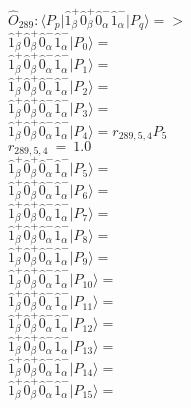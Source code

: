 \documentclass[14pt]{article}
\begin{document}
    $\hat{O}_{289}:  \langle{P_p}\vert \hat{1}_{\beta}^{+}\hat{0}_{\beta}^{+}\hat{0}_{\alpha}^{-}\hat{1}_{\alpha}^{-} \vert{P_q}\rangle => $ \\ 
    $ \hat{1}_{\beta}^{+}\hat{0}_{\beta}^{+}\hat{0}_{\alpha}^{-}\hat{1}_{\alpha}^{-} \vert{P_{0}}\rangle =  $ \\ 
    $ \hat{1}_{\beta}^{+}\hat{0}_{\beta}^{+}\hat{0}_{\alpha}^{-}\hat{1}_{\alpha}^{-} \vert{P_{1}}\rangle =  $ \\ 
    $ \hat{1}_{\beta}^{+}\hat{0}_{\beta}^{+}\hat{0}_{\alpha}^{-}\hat{1}_{\alpha}^{-} \vert{P_{2}}\rangle =  $ \\ 
    $ \hat{1}_{\beta}^{+}\hat{0}_{\beta}^{+}\hat{0}_{\alpha}^{-}\hat{1}_{\alpha}^{-} \vert{P_{3}}\rangle =  $ \\ 
    $ \hat{1}_{\beta}^{+}\hat{0}_{\beta}^{+}\hat{0}_{\alpha}^{-}\hat{1}_{\alpha}^{-} \vert{P_{4}}\rangle = {r}_{289,5,4}P_{5} $ \\ 
    ${r}_{289,5,4}\ =\ 1.0 $ \\ 
    $ \hat{1}_{\beta}^{+}\hat{0}_{\beta}^{+}\hat{0}_{\alpha}^{-}\hat{1}_{\alpha}^{-} \vert{P_{5}}\rangle =  $ \\ 
    $ \hat{1}_{\beta}^{+}\hat{0}_{\beta}^{+}\hat{0}_{\alpha}^{-}\hat{1}_{\alpha}^{-} \vert{P_{6}}\rangle =  $ \\ 
    $ \hat{1}_{\beta}^{+}\hat{0}_{\beta}^{+}\hat{0}_{\alpha}^{-}\hat{1}_{\alpha}^{-} \vert{P_{7}}\rangle =  $ \\ 
    $ \hat{1}_{\beta}^{+}\hat{0}_{\beta}^{+}\hat{0}_{\alpha}^{-}\hat{1}_{\alpha}^{-} \vert{P_{8}}\rangle =  $ \\ 
    $ \hat{1}_{\beta}^{+}\hat{0}_{\beta}^{+}\hat{0}_{\alpha}^{-}\hat{1}_{\alpha}^{-} \vert{P_{9}}\rangle =  $ \\ 
    $ \hat{1}_{\beta}^{+}\hat{0}_{\beta}^{+}\hat{0}_{\alpha}^{-}\hat{1}_{\alpha}^{-} \vert{P_{10}}\rangle =  $ \\ 
    $ \hat{1}_{\beta}^{+}\hat{0}_{\beta}^{+}\hat{0}_{\alpha}^{-}\hat{1}_{\alpha}^{-} \vert{P_{11}}\rangle =  $ \\ 
    $ \hat{1}_{\beta}^{+}\hat{0}_{\beta}^{+}\hat{0}_{\alpha}^{-}\hat{1}_{\alpha}^{-} \vert{P_{12}}\rangle =  $ \\ 
    $ \hat{1}_{\beta}^{+}\hat{0}_{\beta}^{+}\hat{0}_{\alpha}^{-}\hat{1}_{\alpha}^{-} \vert{P_{13}}\rangle =  $ \\ 
    $ \hat{1}_{\beta}^{+}\hat{0}_{\beta}^{+}\hat{0}_{\alpha}^{-}\hat{1}_{\alpha}^{-} \vert{P_{14}}\rangle =  $ \\ 
    $ \hat{1}_{\beta}^{+}\hat{0}_{\beta}^{+}\hat{0}_{\alpha}^{-}\hat{1}_{\alpha}^{-} \vert{P_{15}}\rangle =  $ \\ 
    
\end{document}
